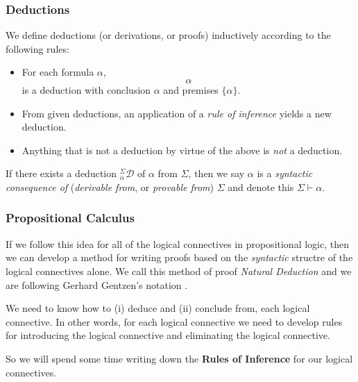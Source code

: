 \documentclass{beamer}
\begin{document}
\begin{frame}
	\frametitle{Deductions}
	
	\begin{center} We define deductions (or derivations, or proofs) inductively according to the following rules: 
	
	\begin{itemize}
		\item For each formula $\alpha$,
		$$ \alpha $$
		is a deduction with conclusion $\alpha$ and premises $\{\alpha\}$.
		
		\item From given deductions, an application of a \textit{rule of inference} yields a new deduction.
		
		\item Anything that is not a deduction by virtue of the above is \emph{not} a deduction. 
	\end{itemize}

	\end{center}
	
	\vspace{0.3cm}

	If there exists a deduction $^\Sigma_{\alpha}\mathcal{D}$ of $\alpha$ from $\Sigma$, then we say $\alpha$ is a \textit{syntactic consequence of }(\textit{derivable from}, or \textit{provable from}) $\Sigma$ and denote this $\Sigma \vdash \alpha$. 
	
	
\end{frame}

\begin{frame}
	\frametitle{Propositional Calculus}
	
	If we follow this idea for all of the logical connectives in propositional logic, then we can develop a method for writing proofs based on the \textit{syntactic} structre of the logical connectives alone. We call this method of proof \emph{Natural Deduction} and we are following Gerhard Gentzen's notation \cite{vDalen,thompson}.
	
	\vspace{0.3cm}
	
	We need to know how to (i) deduce and (ii) conclude from, each logical connective. In other words, for each logical connective we need to develop rules for introducing the logical connective and eliminating the logical connective.
	
	\vspace{0.3cm}
	
	So we will spend some time writing down the {\bf Rules of Inference} for our logical connectives. 
	
\end{frame}
\end{document}
